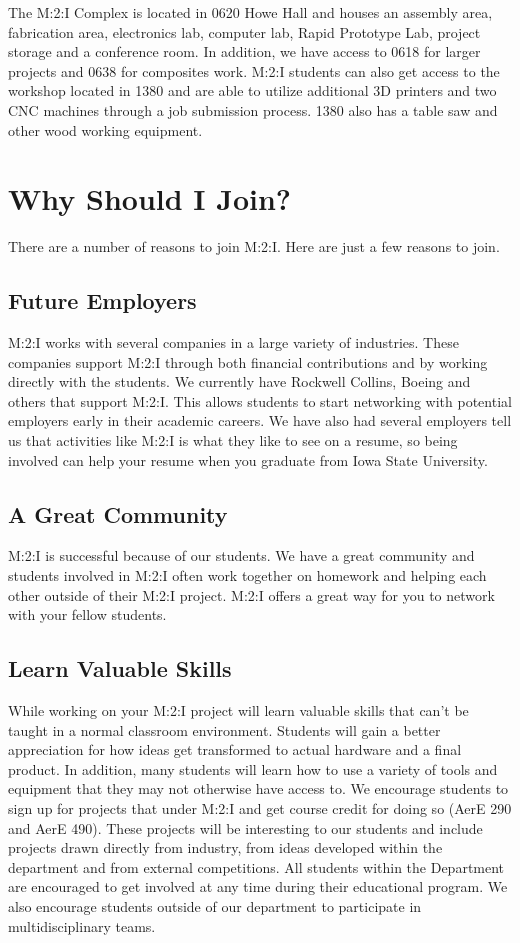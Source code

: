 \documentclass[10pt,foldmark,notumble]{leaflet}
\begin{document}
The M:2:I Complex is located in 0620 Howe Hall and houses an assembly area, fabrication area, electronics lab, computer lab, Rapid Prototype Lab, project storage and a conference room.  In addition, we have access to 0618 for larger projects and 0638 for composites work.  M:2:I students can also get access to the workshop located in 1380 and are able to utilize additional 3D printers and two CNC machines through a job submission process.  1380 also has a table saw and other wood working equipment.

\section{Why Should I Join?}

There are a number of reasons to join M:2:I.  Here are just a few reasons to join.

\subsection{Future Employers}
M:2:I works with several companies in a large variety of industries.  These companies support M:2:I through both financial contributions and by working directly with the students.  We currently have Rockwell Collins, Boeing and others that support M:2:I.  This allows students to start networking with potential employers early in their academic careers.  We have also had several employers tell us that activities like M:2:I is what they like to see on a resume, so being involved can help your resume when you graduate from Iowa State University.

\subsection{A Great Community}
M:2:I is successful because of our students.  We have a great community and students involved in M:2:I often work together on homework and helping each other outside of their M:2:I project.  M:2:I offers a great way for you to network with your fellow students.

\subsection{Learn Valuable Skills}
While working on your M:2:I project will learn valuable skills that can't be taught in a normal classroom environment.  Students will gain a better appreciation for how ideas get transformed to actual hardware and a final product.  In addition, many students will learn how to use a variety of tools and equipment that they may not otherwise have access to.  We encourage students to sign up for projects that under M:2:I and get course credit for doing so (AerE 290 and AerE 490).  These projects will be interesting to our students and include projects drawn directly from industry, from ideas developed within the department and from external competitions.  All students within the Department are encouraged to get involved at any time during their educational program.  We also encourage students outside of our department to participate in multidisciplinary teams.
\end{document}
